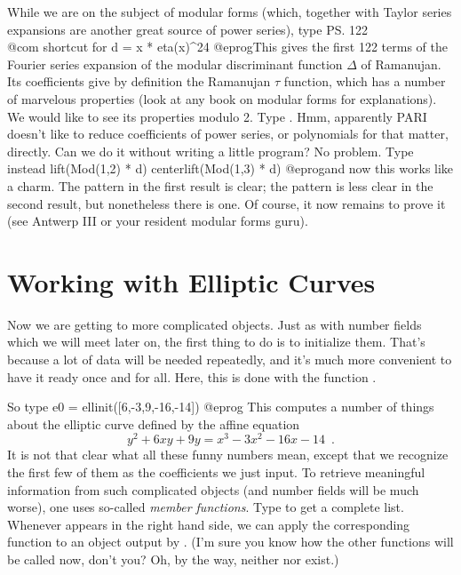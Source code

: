 While we are on the subject of modular forms (which, together with Taylor
series expansions are another great source of power series), type
\bprog
  \ps 122     \\@com shortcut for 
  d = x * eta(x)^24
@eprog\noindent This gives the first 122 terms of the Fourier series
expansion of the modular discriminant function $\Delta$ of Ramanujan. Its
coefficients give by definition the Ramanujan $\tau$ function, which has a
number of marvelous properties (look at any book on modular forms for
explanations). We would like to see its properties modulo 2. Type .
Hmm, apparently PARI doesn't like to reduce coefficients of power series, or
polynomials for that matter, directly. Can we do it without writing a little
program? No problem. Type instead
\bprog
  lift(Mod(1,2) * d)
  centerlift(Mod(1,3) * d)
@eprog\noindent and now this works like a charm. The pattern in the first
result is clear; the pattern is less clear in the second result, but
nonetheless there is one. Of course, it now remains to prove it (see Antwerp
III or your resident modular forms guru).

\section{Working with Elliptic Curves}

Now we are getting to more complicated objects. Just as with number fields
which we will meet later on, the first thing to do is to initialize them.
That's because a lot of data will be needed repeatedly, and it's much more
convenient to have it ready once and for all. Here, this is done with the
function .

So type
\bprog
  e0 = ellinit([6,-3,9,-16,-14])
@eprog
This computes a number of things
about the elliptic curve defined by the affine equation
%
$$ y^2+6xy+9y = x^3-3x^2-16x-14\enspace. $$
%
It is not that clear what all these funny numbers mean, except that we
recognize the first few of them as the coefficients we just input. To
retrieve meaningful information from such complicated objects (and number
fields will be much worse), one uses so-called \emph{member
functions}. Type  to get a complete list. Whenever  appears
in the right hand side, we can apply the corresponding function to an object
output by . (I'm sure you know how the other  functions
will be called now, don't you? Oh, by the way, neither  nor
 exist.)

